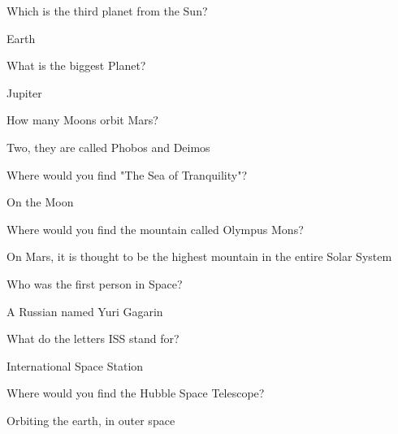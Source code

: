 
Which is the third planet from the Sun?

Earth

What is the biggest Planet?

Jupiter

How many Moons orbit Mars?

Two, they are called Phobos and Deimos

Where would you find "The Sea of Tranquility"?

On the Moon

Where would you find the mountain called Olympus Mons?

On Mars, it is thought to be the highest mountain in the entire Solar System

Who was the first person in Space?

A Russian named Yuri Gagarin

What do the letters ISS stand for?

International Space Station

Where would you find the Hubble Space Telescope?

Orbiting the earth, in outer space
